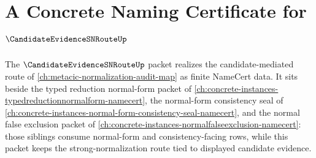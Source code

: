 \chapter{A Concrete Naming Certificate for $\CandidateEvidenceSNRouteUp$}
\label{ch:concrete-instances-candidate-evidence-sn-route-namecert}

The $\CandidateEvidenceSNRouteUp$ packet realizes the candidate-mediated route of \autoref{ch:metacic-normalization-audit-map} as finite NameCert data. It sits beside the typed reduction normal-form packet of \autoref{ch:concrete-instances-typedreductionnormalform-namecert}, the normal-form consistency seal of \autoref{ch:concrete-instances-normal-form-consistency-seal-namecert}, and the normal false exclusion packet of \autoref{ch:concrete-instances-normalfalseexclusion-namecert}: those siblings consume normal-form and consistency-facing rows, while this packet keeps the strong-normalization route tied to displayed candidate evidence.

